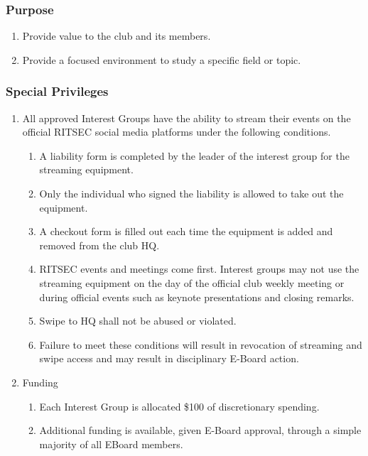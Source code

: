 \subsubsection{Purpose}

\begin{enumerate}
  \item Provide value to the club and its members.
  \item Provide a focused environment to study a specific field or topic.
\end{enumerate}

\subsubsection{Special Privileges}

\begin{enumerate}
  \item All approved Interest Groups have the ability to stream their events on
    the official RITSEC social media platforms under the following conditions.
  \begin{enumerate}
    \item A liability form is completed by the leader of the interest group for
      the streaming equipment.
    \item Only the individual who signed the liability is allowed to take out
      the equipment.
    \item A checkout form is filled out each time the equipment is added and
      removed from the club HQ.
    \item RITSEC events and meetings come first. Interest groups may not use
      the streaming equipment on the day of the official club weekly meeting or
      during official events such as keynote presentations and closing remarks.
    \item Swipe to HQ shall not be abused or violated.
    \item Failure to meet these conditions will result in revocation of
      streaming and swipe access and may result in disciplinary E-Board action.
  \end{enumerate}
  \item Funding
  \begin{enumerate}
    \item Each Interest Group is allocated \$100 of discretionary spending.
    \item Additional funding is available, given E-Board approval, through a
      simple majority of all EBoard members. 
  \end{enumerate}
\end{enumerate}

